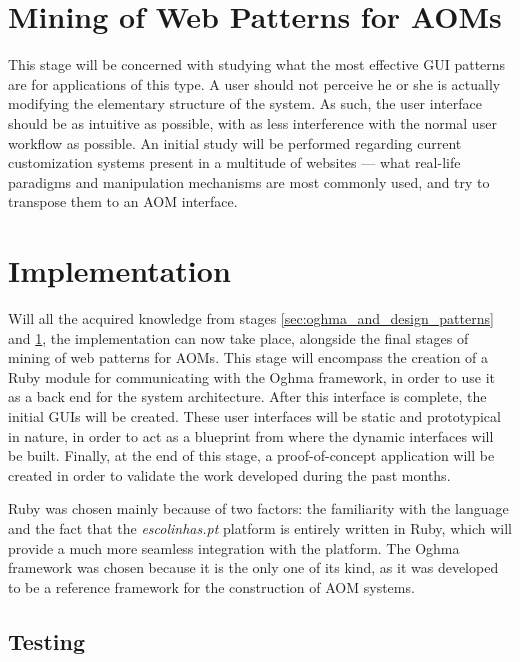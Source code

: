 \section{Mining of Web Patterns for AOMs}\label{sec:mining_of_web_patterns}

This stage will be concerned with studying what the most effective GUI patterns are for applications of this type. A user should not perceive he or she is actually modifying the elementary structure of the system. As such, the user interface should be as intuitive as possible, with as less interference with the normal user workflow as possible. An initial study will be performed regarding current customization systems present in a multitude of websites --- what real-life paradigms and manipulation mechanisms are most commonly used, and try to transpose them to an AOM interface.

\section{Implementation}\label{sec:implementation}

Will all the acquired knowledge from stages \ref{sec:oghma_and_design_patterns} and \ref{sec:mining_of_web_patterns}, the implementation can now take place, alongside the final stages of mining of web patterns for AOMs. This stage will encompass the creation of a Ruby module for communicating with the Oghma framework, in order to use it as a back end for the system architecture. After this interface is complete, the initial GUIs will be created. These user interfaces will be static and prototypical in nature, in order to act as a blueprint from where the dynamic interfaces will be built. Finally, at the end of this stage, a proof-of-concept application will be created in order to validate the work developed during the past months.

Ruby was chosen mainly because of two factors: the familiarity with the language and the fact that the \textit{escolinhas.pt} platform is entirely written in Ruby, which will provide a much more seamless integration with the platform. The Oghma framework was chosen because it is the only one of its kind, as it was developed to be a reference framework for the construction of AOM systems. 

\subsection{Testing}\label{sec:testing}

